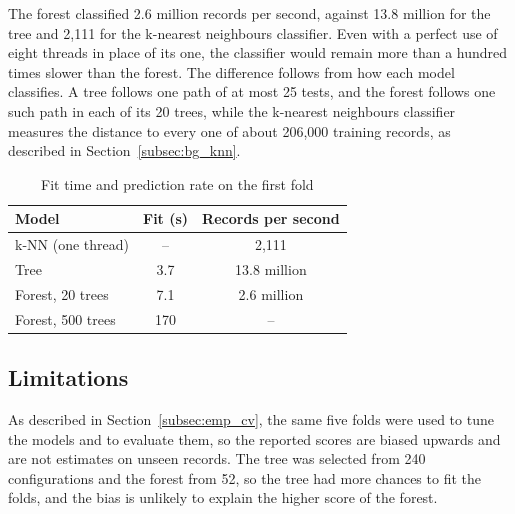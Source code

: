 \documentclass[conference,10pt]{IEEEtran}
\begin{document}
The forest classified 2.6 million records per second, against 13.8 million
for the tree and 2,111 for the k-nearest neighbours classifier. Even with a perfect use of eight threads in place of its one, the classifier
would remain more than a hundred times slower than the forest. The difference follows from how each model
classifies. A tree follows one path of at most 25 tests, and the forest
follows one such path in each of its 20 trees, while the k-nearest
neighbours classifier measures the distance to every one of about 206,000
training records, as described in Section~\ref{subsec:bg_knn}. 

\begin{table}[t]
  \centering
  \caption{Fit time and prediction rate on the first fold}
  \label{tab:cost}
  \begin{tabular}{lcc}
    \toprule
    Model & Fit (s) & Records per second \\
    \midrule
    k-NN (one thread) & --  & 2,111 \\
    Tree              & 3.7 & 13.8 million \\
    Forest, 20 trees  & 7.1 & 2.6 million \\
    Forest, 500 trees & 170 & -- \\
    \bottomrule
  \end{tabular}
\end{table}

\subsection{Limitations}
\label{subsec:res_limitations}

As described in Section~\ref{subsec:emp_cv}, the same five folds were used to tune the models and to evaluate them, so the reported scores are biased upwards
and are not estimates on unseen records. The tree was selected from 240
configurations and the forest from 52, so the tree had more chances to fit
the folds, and the bias is unlikely to explain the higher score of the forest.
\end{document}

